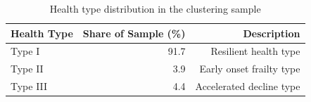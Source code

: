 \begin{table}[ht]
    \centering
    \caption{Health type distribution in the clustering sample}
    \label{tab:type_dist}
    \begin{tabular}{lrr}
        \toprule
        Health Type & Share of Sample (\%) & Description \\
        \midrule
        Type I & 91.7 & Resilient health type \\
        Type II & 3.9 & Early onset frailty type \\
        Type III & 4.4 & Accelerated decline type \\
        \bottomrule
    \end{tabular}
\end{table}
